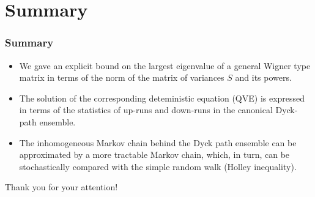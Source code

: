 \documentclass{beamer}
\numberwithin{equation}{section}
\newcommand{\deq}{\mathrel{\mathop:}=}
\newcommand{\E}{{\mathbb E }}
\newcommand{\Cr}{\color{red}}
\renewcommand{\emph}[1]{{\Cr{#1}}}
\newcommand{\bemph}[1]{\textbf{\Cr{#1}}}
\newcommand{\e}{\varepsilon}
\begin{document}
\section{Summary}

\begin{frame}
\frametitle{Summary}
\begin{itemize}
	\item We gave an explicit bound on the largest eigenvalue of a general Wigner type matrix in terms of the norm of the  matrix of variances $S$ and its powers.
	\item The solution of the corresponding deteministic equation (QVE) is expressed in terms of the statistics of up-runs and down-runs in the canonical Dyck-path ensemble.
	\item The inhomogeneous Markov chain behind the Dyck path ensemble can be approximated by a more tractable Markov chain, which, in turn, can be stochastically compared with the simple random walk (Holley inequality).
\end{itemize}


Thank you for your attention!
\end{frame}

%		

\begin{frame}
\vspace*{\fill}
\hspace*{\fill}
{\huge\bemph{Additional material}}
\hspace*{\fill}
\vspace*{\fill}
\end{frame}
\end{document}
